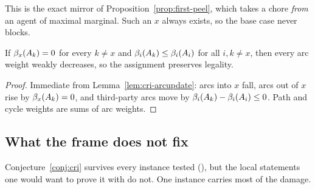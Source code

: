 This is the exact mirror of Proposition~\ref{prop:first-peel}, which takes a
chore \emph{from} an agent of maximal marginal. Such an $x$ always exists, so
the base case never blocks.

\begin{lemma}
\label{lem:cri-free}
If $\beta_x(A_{k}) = 0$ for every $k \ne x$ and $\beta_i(A_{k}) \le
\beta_i(A_{i})$ for all $i,k \ne x$, then every arc weight weakly decreases,
so the assignment preserves legality.
\end{lemma}

\begin{proof}
Immediate from Lemma~\ref{lem:cri-arcupdate}: arcs into $x$ fall, arcs out of
$x$ rise by $\beta_x(A_{k}) = 0$, and third-party arcs move by
$\beta_i(A_{k}) - \beta_i(A_{i}) \le 0$. Path and cycle weights are
sums of arc weights.
\end{proof}

\subsection{What the frame does not fix}
\label{sec:cri-refuted}

Conjecture~\ref{conj:cri} survives every instance tested (),
but the local statements one would want to prove it with do not. One instance
carries most of the damage.

